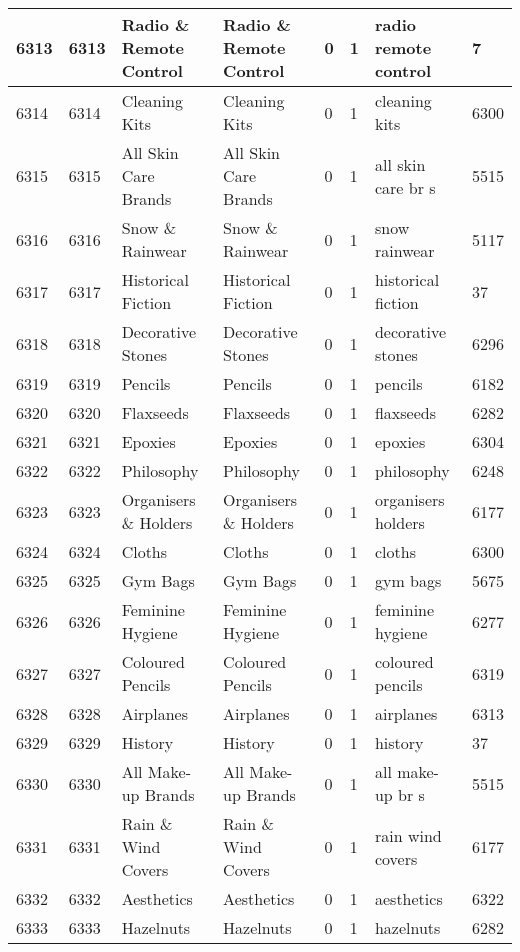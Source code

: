 \begin{longtable}{|l|l|l|l|l|l|l|l|}
6313 & 6313 & Radio \& Remote Control & Radio \& Remote Control & 0 & 1 & radio remote control & 7 \\ \hline 
6314 & 6314 & Cleaning Kits & Cleaning Kits & 0 & 1 & cleaning kits & 6300 \\ \hline 
6315 & 6315 & All Skin Care Brands & All Skin Care Brands & 0 & 1 & all skin care br s & 5515 \\ \hline 
6316 & 6316 & Snow \& Rainwear & Snow \& Rainwear & 0 & 1 & snow rainwear & 5117 \\ \hline 
6317 & 6317 & Historical Fiction & Historical Fiction & 0 & 1 & historical fiction & 37 \\ \hline 
6318 & 6318 & Decorative Stones & Decorative Stones & 0 & 1 & decorative stones & 6296 \\ \hline 
6319 & 6319 & Pencils & Pencils & 0 & 1 & pencils & 6182 \\ \hline 
6320 & 6320 & Flaxseeds & Flaxseeds & 0 & 1 & flaxseeds & 6282 \\ \hline 
6321 & 6321 & Epoxies & Epoxies & 0 & 1 & epoxies & 6304 \\ \hline 
6322 & 6322 & Philosophy & Philosophy & 0 & 1 & philosophy & 6248 \\ \hline 
6323 & 6323 & Organisers \& Holders & Organisers \& Holders & 0 & 1 & organisers holders & 6177 \\ \hline 
6324 & 6324 & Cloths & Cloths & 0 & 1 & cloths & 6300 \\ \hline 
6325 & 6325 & Gym Bags & Gym Bags & 0 & 1 & gym bags & 5675 \\ \hline 
6326 & 6326 & Feminine Hygiene & Feminine Hygiene & 0 & 1 & feminine hygiene & 6277 \\ \hline 
6327 & 6327 & Coloured Pencils & Coloured Pencils & 0 & 1 & coloured pencils & 6319 \\ \hline 
6328 & 6328 & Airplanes & Airplanes & 0 & 1 & airplanes & 6313 \\ \hline 
6329 & 6329 & History & History & 0 & 1 & history & 37 \\ \hline 
6330 & 6330 & All Make-up Brands & All Make-up Brands & 0 & 1 & all make-up br s & 5515 \\ \hline 
6331 & 6331 & Rain \& Wind Covers & Rain \& Wind Covers & 0 & 1 & rain wind covers & 6177 \\ \hline 
6332 & 6332 & Aesthetics & Aesthetics & 0 & 1 & aesthetics & 6322 \\ \hline 
6333 & 6333 & Hazelnuts & Hazelnuts & 0 & 1 & hazelnuts & 6282 \\ \hline 

\end{longtable}

